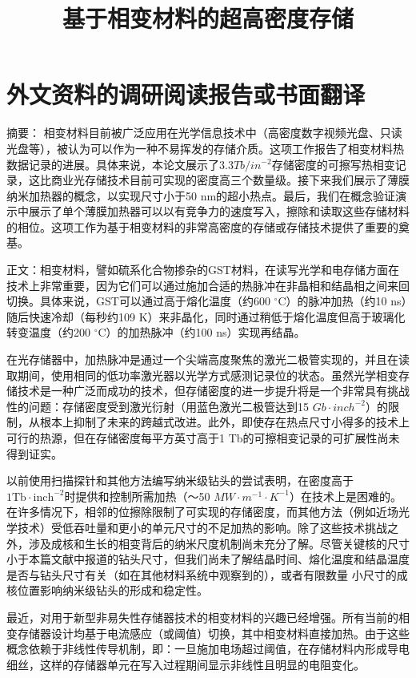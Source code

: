 
\chapter{外文资料的调研阅读报告或书面翻译}

\title{基于相变材料的超高密度存储}

{\heiti 摘要：} 
相变材料目前被广泛应用在光学信息技术中（高密度数字视频光盘、只读光盘等），被认为可以作为一种不易挥发的存储介质。这项工作报告了相变材料热数据记录的进展。具体来说，本论文展示了$3.3Tb/in^{-2}$存储密度的可擦写热相变记录，这比商业光存储技术目前可实现的密度高三个数量级。接下来我们展示了薄膜纳米加热器的概念，以实现尺寸小于50 nm的超小热点。最后，我们在概念验证演示中展示了单个薄膜加热器可以以有竞争力的速度写入，擦除和读取这些存储材料的相位。这项工作为基于相变材料的非常高密度的存储或存储技术提供了重要的奠基。

{\heiti 正文：}相变材料，譬如硫系化合物掺杂的GST材料，在读写光学和电存储方面在技术上非常重要，因为它们可以通过施加合适的热脉冲在非晶相和结晶相之间来回切换。具体来说，GST可以通过高于熔化温度（约600 $^{\circ}$C）的脉冲加热（约10 ns）随后快速冷却（每秒约109 K）来非晶化，同时通过稍低于熔化温度但高于玻璃化转变温度（约200 $^{\circ}$C）的加热脉冲（约100 ns）实现再结晶。

在光存储器中，加热脉冲是通过一个尖端高度聚焦的激光二极管实现的，并且在读取期间，使用相同的低功率激光器以光学方式感测记录位的状态。虽然光学相变存储技术是一种广泛而成功的技术，但存储密度的进一步提升将是一个非常具有挑战性的问题：存储密度受到激光衍射（用蓝色激光二极管达到15 $Gb \cdot{} inch^{-2}$）的限制，从根本上抑制了未来的跨越式改进。此外，即使存在热点尺寸小得多的技术上可行的热源，但在存储密度每平方英寸高于1 Tb的可擦相变记录的可扩展性尚未得到证实。

以前使用扫描探针和其他方法编写纳米级钻头的尝试表明，在密度高于$1\mathrm{Tb} \cdot{} \mathrm{inch}^{-2}$时提供和控制所需加热（〜50 $MW \cdot{} m^{-1} \cdot{} K^{-1}$）在技术上是困难的。在许多情况下，相邻的位擦除限制了可实现的存储密度，而其他方法（例如近场光学技术）受低吞吐量和更小的单元尺寸的不足加热的影响。除了这些技术挑战之外，涉及成核和生长的相变背后的纳米尺度机制尚未充分了解。尽管关键核的尺寸小于本篇文献中报道的钻头尺寸，但我们尚未了解结晶时间、熔化温度和结晶温度是否与钻头尺寸有关（如在其他材料系统中观察到的），或者有限数量 小尺寸的成核位置影响纳米级钻头的形成和稳定性。

最近，对用于新型非易失性存储器技术的相变材料的兴趣已经增强。所有当前的相变存储器设计均基于电流感应（或阈值）切换，其中相变材料直接加热。由于这些概念依赖于非线性传导机制，即：一旦施加电场超过阈值，在存储材料内形成导电细丝，这样的存储器单元在写入过程期间显示非线性且明显的电阻变化。

